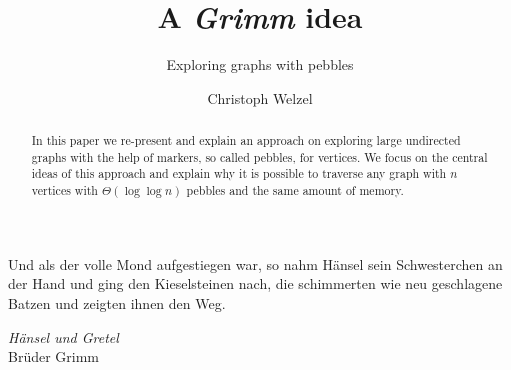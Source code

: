 \documentclass[draft,oneside]{scrartcl}
\begin{document}
\setlength{\epigraphwidth}{0.7\textwidth}

\title{A \emph{Grimm} idea}
\subtitle{Exploring graphs with pebbles}
\author{Christoph Welzel}
\maketitle

\begin{abstract}
  In this paper we re-present and explain an approach on exploring large
  undirected graphs with the help of markers, so called pebbles, for vertices.
  We focus on the central ideas of this approach and explain why it is possible
  to traverse any graph with $n$ vertices with $\Theta(\log \log n)$ pebbles
  and the same amount of memory.
\end{abstract}


\epigraph{Und als der volle Mond aufgestiegen war, so nahm Hänsel sein %
Schwesterchen an der Hand und ging den Kieselsteinen nach, die schimmerten %
wie neu geschlagene Batzen und zeigten ihnen den Weg.}%
{\emph{Hänsel und Gretel}\\Brüder Grimm}

\end{document}
